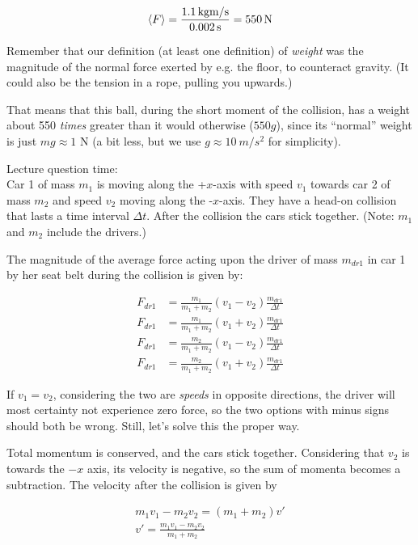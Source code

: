 \documentclass[12pt,a4paper]{report}
\begin{document}
\begin{equation}
\Braket{F} = \frac{\SI{1.1}{kg m/s}}{\SI{0.002}{s}} = \SI{550}{N}
\end{equation}

Remember that our definition (at least one definition) of \emph{weight} was the magnitude of the normal force exerted by e.g. the floor, to counteract gravity. (It could also be the tension in a rope, pulling you upwards.)

That means that this ball, during the short moment of the collision, has a weight about 550 \emph{times} greater than it would otherwise ($550 g$), since its ``normal'' weight is just $m g \approx 1$ N (a bit less, but we use $g \approx \SI{10}{m/s^2}$ for simplicity).

Lecture question time:\\
Car 1 of mass $m_1$ is moving along the +$x$-axis with speed $v_1$ towards car 2 of mass $m_2$ and speed $v_2$ moving along the -$x$-axis. They have a head-on collision that lasts a time interval $\Delta t$. After the collision the cars stick together. (Note: $m_1$ and $m_2$ include the drivers.)

The magnitude of the average force acting upon the driver of mass $m_{dr1}$ in car 1 by her seat belt during the collision is given by:

\begin{align}
F_{dr1} &= \frac{m_1}{m_1 + m_2} (v_1 - v_2) \frac{m_{dr1}}{\Delta t}\\
F_{dr1} &= \frac{m_1}{m_1 + m_2} (v_1 + v_2) \frac{m_{dr1}}{\Delta t}\\
F_{dr1} &= \frac{m_2}{m_1 + m_2} (v_1 - v_2) \frac{m_{dr1}}{\Delta t}\\
F_{dr1} &= \frac{m_2}{m_1 + m_2} (v_1 + v_2) \frac{m_{dr1}}{\Delta t}
\end{align}

If $v_1 = v_2$, considering the two are \emph{speeds} in opposite directions, the driver will most certainty not experience zero force, so the two options with minus signs should both be wrong. Still, let's solve this the proper way.

Total momentum is conserved, and the cars stick together. Considering that $v_2$ is towards the $-x$ axis, its velocity is negative, so the sum of momenta becomes a subtraction. The velocity after the collision is given by

\begin{align}
m_1 v_1 - m_2 v_2 = (m_1 + m_2) v'\\
v' = \frac{m_1 v_1 - m_2 v_2}{m_1 + m_2}
\end{align}
\end{document}
